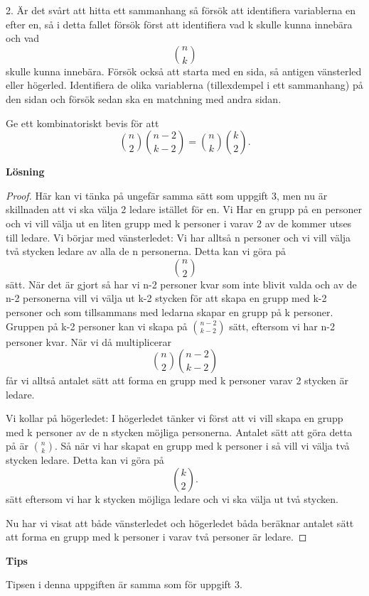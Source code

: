 \documentclass{tufte-handout}
\begin{document}
\begin{xca}
         2. Är det svårt att hitta ett sammanhang så försök att identifiera variablerna en efter en, så i detta fallet försök först att identifiera vad k skulle kunna innebära och vad $$\binom{n}{k}$$ skulle kunna innebära. Försök också att starta med en sida, så antigen vänsterled eller högerled. Identifiera de olika variablerna (tillexdempel i ett sammanhang) på den sidan och försök sedan ska en matchning med andra sidan.
\end{xca}

\begin{xca}
	Ge ett kombinatoriskt bevis för att
	$$\binom{n}{2}\binom{n-2}{k-2} = \binom{n}{k}\binom{k}{2}.$$
	
\noindent\textbf{Lösning}
\begin{proof}
Här kan vi tänka på ungefär samma sätt som uppgift 3, men nu är skillnaden att vi ska välja 2 ledare istället för en. 
Vi Har en grupp på en personer och vi vill välja ut en liten grupp med k personer i varav 2 av de kommer utses till ledare. 
Vi börjar med vänsterledet: Vi har alltså n personer och vi vill välja två stycken ledare av alla de n personerna. Detta kan vi göra på $$\binom{n}{2}$$ sätt. När det är gjort så har vi n-2 personer kvar som inte blivit valda och av de n-2 personerna vill vi välja ut k-2 stycken för att skapa en grupp med k-2 personer och som tillsammans med ledarna skapar en grupp på k personer. Gruppen på k-2 personer kan vi skapa på $\binom{n-2}{k-2}$ sätt, eftersom vi har n-2 personer kvar. När vi då multiplicerar $$\binom{n}{2}\binom{n-2}{k-2}$$ får vi alltså antalet sätt att forma en grupp med k personer varav 2 stycken är ledare. 

Vi kollar på högerledet: I högerledet tänker vi först att vi vill skapa en grupp med k personer av de n stycken möjliga personerna. Antalet sätt att göra detta på är $\binom{n}{k}$. Så när vi har skapat en grupp med k personer i så vill vi välja två stycken ledare. Detta kan vi göra på $$\binom{k}{2}.$$ sätt eftersom vi har k stycken möjliga ledare och vi ska välja ut två stycken. 

Nu har vi visat att både vänsterledet och högerledet båda beräknar antalet sätt att forma en grupp med k personer i varav två personer är ledare. 
\end{proof}
\noindent\textbf{Tips}

Tipsen i denna uppgiften är samma som för uppgift 3. 

\end{xca}
\end{document}
